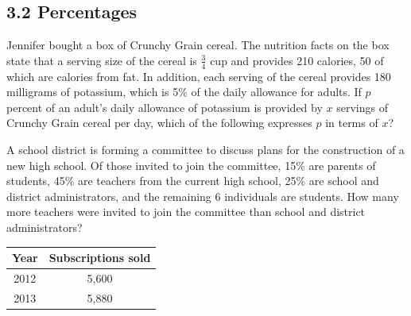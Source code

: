 \subsection*{3.2 Percentages}

\vspace{0.5em}

\setcounter{questionnum}{0}


\noindent\markforreview
\vspace{1em}

Jennifer bought a box of Crunchy Grain cereal.  
The nutrition facts on the box state that a serving size of the cereal is $\frac{3}{4}$ cup and provides 210 calories, 50 of which are calories from fat.  
In addition, each serving of the cereal provides 180 milligrams of potassium, which is 5\% of the daily allowance for adults.  
If $p$ percent of an adult’s daily allowance of potassium is provided by $x$ servings of Crunchy Grain cereal per day, which of the following expresses $p$ in terms of $x$?

\vspace{0.75em}


\vspace{2em}

\noindent\markforreview
\vspace{1em}

A school district is forming a committee to discuss plans for the construction of a new high school.  
Of those invited to join the committee, 15\% are parents of students, 45\% are teachers from the current high school, 25\% are school and district administrators, and the remaining 6 individuals are students.  
How many more teachers were invited to join the committee than school and district administrators?

\newpage

\noindent\markforreview
\vspace{1em}

\begin{tabular}{|c|c|}
\hline
Year & Subscriptions sold \\
\hline
2012 & 5,600 \\
2013 & 5,880 \\
\hline
\end{tabular}

\vspace{1em}

